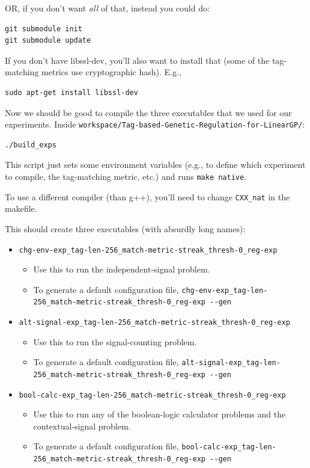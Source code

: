 \documentclass[]{book}
\providecommand{\tightlist}{%
  \setlength{\itemsep}{0pt}\setlength{\parskip}{0pt}}
\begin{document}
OR, if you don't want \emph{all} of that, instead you could do:

\begin{verbatim}
git submodule init
git submodule update
\end{verbatim}

If you don't have libssl-dev, you'll also want to install that (some of the tag-matching metrics use cryptographic hash). E.g.,

\begin{verbatim}
sudo apt-get install libssl-dev
\end{verbatim}

Now we should be good to compile the three executables that we used for our experiments. Inside \texttt{workspace/Tag-based-Genetic-Regulation-for-LinearGP/}:

\begin{verbatim}
./build_exps
\end{verbatim}

This script just sets some environment variables (e.g., to define which experiment to compile, the tag-matching metric, etc.) and runs \texttt{make\ native}.

To use a different compiler (than g++), you'll need to change \texttt{CXX\_nat} in the makefile.

This should create three executables (with absurdly long names):

\begin{itemize}
\tightlist
\item
  \texttt{chg-env-exp\_tag-len-256\_match-metric-streak\_thresh-0\_reg-exp}

  \begin{itemize}
  \tightlist
  \item
    Use this to run the independent-signal problem.
  \item
    To generate a default configuration file, \texttt{chg-env-exp\_tag-len-256\_match-metric-streak\_thresh-0\_reg-exp\ -\/-gen}
  \end{itemize}
\item
  \texttt{alt-signal-exp\_tag-len-256\_match-metric-streak\_thresh-0\_reg-exp}

  \begin{itemize}
  \tightlist
  \item
    Use this to run the signal-counting problem.
  \item
    To generate a default configuration file, \texttt{alt-signal-exp\_tag-len-256\_match-metric-streak\_thresh-0\_reg-exp\ -\/-gen}
  \end{itemize}
\item
  \texttt{bool-calc-exp\_tag-len-256\_match-metric-streak\_thresh-0\_reg-exp}

  \begin{itemize}
  \tightlist
  \item
    Use this to run any of the boolean-logic calculator problems and the contextual-signal problem.
  \item
    To generate a default configuration file, \texttt{bool-calc-exp\_tag-len-256\_match-metric-streak\_thresh-0\_reg-exp\ -\/-gen}
  \end{itemize}
\end{itemize}
\end{document}
